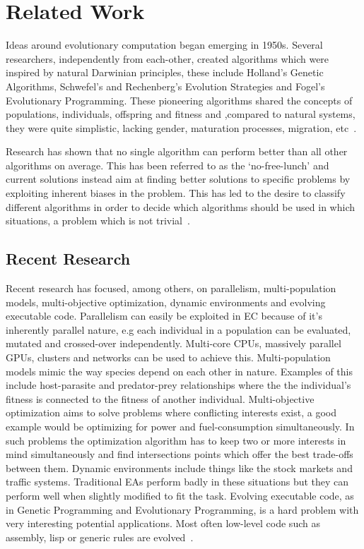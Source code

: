 \section{Related Work}

Ideas around evolutionary computation began emerging in 1950s. Several researchers, independently from each-other, created algorithms which were inspired by natural Darwinian principles, these include Holland's Genetic Algorithms, Schwefel's and Rechenberg's Evolution Strategies and Fogel's Evolutionary Programming. These pioneering algorithms shared the concepts of populations, individuals, offspring and fitness and ,compared to natural systems, they were quite simplistic, lacking gender, maturation processes, migration, etc~\cite{dejong2009EC}.

Research has shown that no single algorithm can perform better than all other algorithms on average. This has been referred to as the `no-free-lunch' and current solutions instead aim at finding better solutions to specific problems by exploiting inherent biases in the problem. This has led to the desire to classify different algorithms in order to decide which algorithms should be used in which situations, a problem which is not trivial~\cite{dejong2009EC}.

\subsection{Recent Research}

Recent research has focused, among others, on parallelism, multi-population models, multi-objective optimization, dynamic environments and evolving executable code. Parallelism can easily be exploited in EC because of it's inherently parallel nature, e.g each individual in a population can be evaluated, mutated and crossed-over independently. Multi-core CPUs, massively parallel GPUs, clusters and networks can be used to achieve this. Multi-population models mimic the way species depend on each other in nature. Examples of this include host-parasite and predator-prey relationships where the the individual's fitness is connected to the fitness of another individual. Multi-objective optimization aims to solve problems where conflicting interests exist, a good example would be optimizing for power and fuel-consumption simultaneously. In such problems the optimization algorithm has to keep two or more interests in mind simultaneously and find intersections points which offer the best trade-offs between them. Dynamic environments include things like the stock markets and traffic systems. Traditional EAs perform badly in these situations but they can perform well when slightly modified to fit the task. Evolving executable code, as in Genetic Programming and Evolutionary Programming, is a hard problem with very interesting potential applications. Most often low-level code such as assembly, lisp or generic rules are evolved~\cite{dejong2009EC}.

